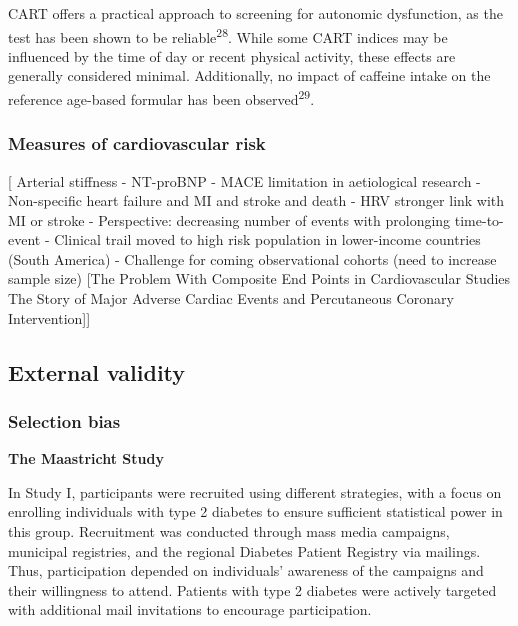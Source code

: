 \documentclass[
  a4paper,
  headsepline=true,
  open=any]{scrbook}
\begin{document}
CART offers a practical approach to screening for autonomic dysfunction,
as the test has been shown to be reliable\textsuperscript{28}. While
some CART indices may be influenced by the time of day or recent
physical activity, these effects are generally considered minimal.
Additionally, no impact of caffeine intake on the reference age-based
formular has been observed\textsuperscript{29}.

\hypertarget{measures-of-cardiovascular-risk}{%
\subsubsection{Measures of cardiovascular
risk}\label{measures-of-cardiovascular-risk}}

{[} Arterial stiffness - NT-proBNP - MACE limitation in aetiological
research - Non-specific heart failure and MI and stroke and death - HRV
stronger link with MI or stroke - Perspective: decreasing number of
events with prolonging time-to-event - Clinical trail moved to high risk
population in lower-income countries (South America) - Challenge for
coming observational cohorts (need to increase sample size) {[}The
Problem With Composite End Points in Cardiovascular Studies The Story of
Major Adverse Cardiac Events and Percutaneous Coronary
Intervention{]}{]}

\hypertarget{external-validity}{%
\subsection{External validity}\label{external-validity}}

\hypertarget{selection-bias}{%
\subsubsection{Selection bias}\label{selection-bias}}

\textbf{The Maastricht Study}

In Study I, participants were recruited using different strategies, with
a focus on enrolling individuals with type 2 diabetes to ensure
sufficient statistical power in this group. Recruitment was conducted
through mass media campaigns, municipal registries, and the regional
Diabetes Patient Registry via mailings. Thus, participation depended on
individuals' awareness of the campaigns and their willingness to attend.
Patients with type 2 diabetes were actively targeted with additional
mail invitations to encourage participation.
\end{document}

